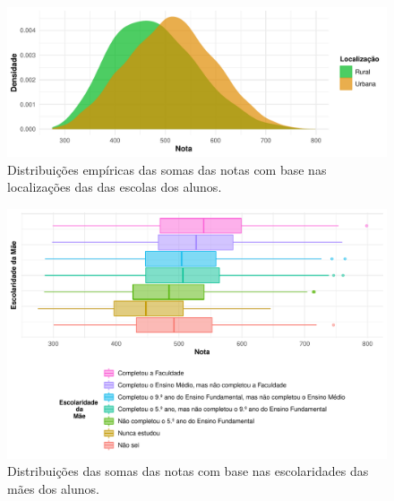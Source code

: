 \newpage
\begin{figure}[htb]
    \caption{Distribuições empíricas das somas das notas com base nas localizações das
    das escolas dos alunos.}
    \begin{center}
        \includegraphics[width=16cm]{img/loc_notas.pdf}
    \end{center}
\end{figure}


\newpage
\begin{figure}[h]
    \caption{Distribuições das somas das notas com base nas escolaridades 
    das mães dos alunos.}
    \begin{center}
        \includegraphics[width=16cm]{img/esc_mae_notas.pdf}
    \end{center}
\end{figure}




